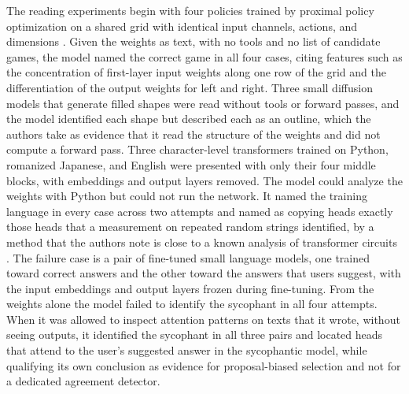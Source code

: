 \documentclass[11pt]{article}
\begin{document}
The reading experiments begin with four policies trained by proximal policy optimization on a shared grid with identical input channels, actions, and dimensions \cite{schulman2017}. Given the weights as text, with no tools and no list of candidate games, the model named the correct game in all four cases, citing features such as the concentration of first-layer input weights along one row of the grid and the differentiation of the output weights for left and right. Three small diffusion models that generate filled shapes were read without tools or forward passes, and the model identified each shape but described each as an outline, which the authors take as evidence that it read the structure of the weights and did not compute a forward pass. Three character-level transformers trained on Python, romanized Japanese, and English were presented with only their four middle blocks, with embeddings and output layers removed. The model could analyze the weights with Python but could not run the network. It named the training language in every case across two attempts and named as copying heads exactly those heads that a measurement on repeated random strings identified, by a method that the authors note is close to a known analysis of transformer circuits \cite{elhage2021}. The failure case is a pair of fine-tuned small language models, one trained toward correct answers and the other toward the answers that users suggest, with the input embeddings and output layers frozen during fine-tuning. From the weights alone the model failed to identify the sycophant in all four attempts. When it was allowed to inspect attention patterns on texts that it wrote, without seeing outputs, it identified the sycophant in all three pairs and located heads that attend to the user's suggested answer in the sycophantic model, while qualifying its own conclusion as evidence for proposal-biased selection and not for a dedicated agreement detector.
\end{document}
